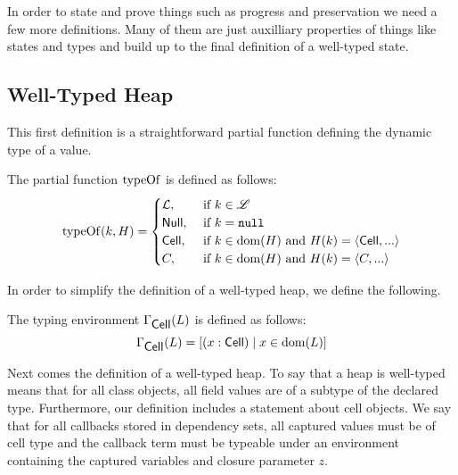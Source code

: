 In order to state and prove things such as progress and preservation we need a few more
definitions. Many of them are just auxilliary properties of things like states
and types and build up to the final definition of a well-typed state.

\subsection{Well-Typed Heap}%
\label{sub:well_typed_heap}

This first definition is a straightforward partial function defining the dynamic
type of a value.
\begin{definition}
  The partial function $\mbox{$\mathrm{typeOf}$}$ is defined as follows:
  \begin{equation}
    \mbox{$\mathrm{typeOf}$}{(k, H)} =
    \begin{cases}
      \mbox{$\mathcal{L}$}, &\text{ if }k \in \mbox{$\mathscr{L}$} \\
      \mbox{$\mathsf{Null}$}, &\text{ if }k = \mbox{\mdseries\texttt{null}} \\
      \mbox{$\mathsf{Cell}$}, &\text{ if }k \in \mbox{$\mathrm{dom}$}{(H)}\text{ and } H(k) = \mbox{$\langle \mbox{$\mathsf{Cell}$}{}, ... \rangle$} \\
      C, &\text{ if }k \in \mbox{$\mathrm{dom}$}{(H)}\text{ and } H(k) = \mbox{$\langle C, ... \rangle$} \\
    \end{cases}
  \end{equation}
\end{definition}
In order to simplify the definition of a well-typed heap, we define the
following.
\begin{definition}
  The typing environment $\Gamma_{\mbox{$\mathsf{Cell}$}}(L)$ is defined as follows:
  \begin{equation}
    \Gamma_{\mbox{$\mathsf{Cell}$}}(L) = \left[(x: \mbox{$\mathsf{Cell}$}) \mid x \in \mbox{$\mathrm{dom}$}(L)\right]
  \end{equation}
\end{definition}
Next comes the definition of a well-typed heap. To say that a heap is
well-typed means that for all class objects, all field values are of
a subtype of the declared type. Furthermore, our definition includes a statement
about cell objects. We say that for all callbacks stored in dependency sets, all
captured values must be of cell type and the callback term must be typeable
under an environment containing the captured variables and closure parameter
$z$.
